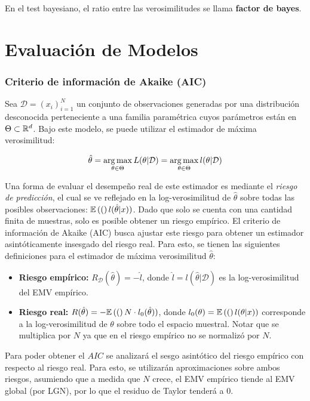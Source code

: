  En el test bayesiano, el ratio entre las verosimilitudes se llama \textbf{factor de bayes}.

\section{Evaluación de Modelos}

\subsubsection{Criterio de información de Akaike (AIC)}

Sea $\mathcal{D}=(x_i)_{i=1}^N$ un conjunto de observaciones generadas por una distribución desconocida perteneciente a una familia paramétrica cuyos parámetros están en $\Theta\subset{\mathbb R}^d$. Bajo este modelo, se puede utilizar el estimador de máxima verosimilitud:

\begin{equation}
	\hat{\theta} = \operatorname*{arg\,max}_{\theta\in\Theta} L(\theta|\mathcal{D}) =  \operatorname*{arg\,max}_{\theta\in\Theta} l(\theta|\mathcal{D})
\end{equation}

Una forma de evaluar el desempeño real de este estimador es mediante el \emph{riesgo de predicción}, el cual se ve reflejado en la log-verosimilitud de $\hat{\theta}$ sobre todas las posibles observaciones: $\mathbb{E} \left((\right)l(\hat{\theta}|x))$. Dado que solo se cuenta con una cantidad finita de muestras, solo es posible obtener un riesgo empírico. El criterio de información de Akaike (AIC) busca ajustar este riesgo para obtener un estimador asintóticamente insesgado del riesgo real. Para esto, se tienen las siguientes definiciones para el estimador de máxima verosimilitud $\hat{\theta}$:

\begin{itemize}
	\item \textbf{Riesgo empírico:} $R_\mathcal{D}(\hat{\theta})=-\hat{l}$, donde $\hat{l}=l(\hat{\theta}|\mathcal{D})$ es la log-verosimilitud del EMV empírico.
	\item \textbf{Riesgo real:} $R(\hat{\theta})=-\mathbb{E} \left((\right)N\cdot l_0(\hat{\theta}))$, donde $l_0(\theta)=\mathbb{E} \left((\right)l(\theta|x))$ corresponde a la log-verosimilitud de $\theta$ sobre todo el espacio muestral. Notar que se multiplica por $N$ ya que en el riesgo empírico no se normalizó por $N$.
\end{itemize}

Para poder obtener el $AIC$ se analizará el sesgo asintótico del riesgo empírico con respecto al riesgo real. Para esto, se utilizarán aproximaciones sobre ambos riesgos, asumiendo que a medida que $N$ crece, el EMV empírico tiende al EMV global (por LGN), por lo que el residuo de Taylor tenderá a 0.\\

